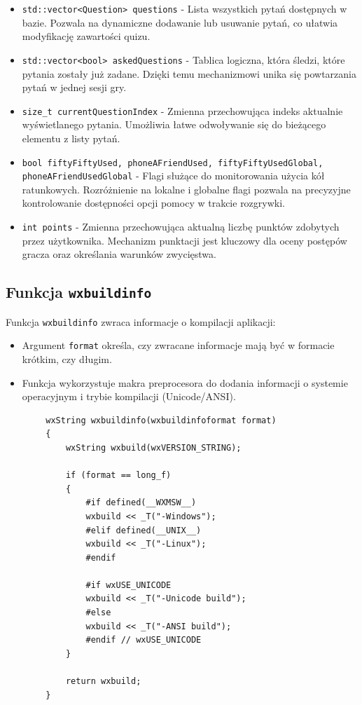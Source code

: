 \documentclass[]{article}
\begin{document}
\begin{itemize}
	\item \texttt{std::vector<Question> questions} - Lista wszystkich pytań dostępnych w bazie. Pozwala na dynamiczne dodawanie lub usuwanie pytań, co ułatwia modyfikację zawartości quizu.
	\item \texttt{std::vector<bool> askedQuestions} - Tablica logiczna, która śledzi, które pytania zostały już zadane. Dzięki temu mechanizmowi unika się powtarzania pytań w jednej sesji gry.
	\item \texttt{size\_t currentQuestionIndex} - Zmienna przechowująca indeks aktualnie wyświetlanego pytania. Umożliwia łatwe odwoływanie się do bieżącego elementu z listy pytań.
	\item \texttt{bool fiftyFiftyUsed, phoneAFriendUsed, fiftyFiftyUsedGlobal, phoneAFriendUsedGlobal} - Flagi służące do monitorowania użycia kół ratunkowych. Rozróżnienie na lokalne i globalne flagi pozwala na precyzyjne kontrolowanie dostępności opcji pomocy w trakcie rozgrywki.
	\item \texttt{int points} - Zmienna przechowująca aktualną liczbę punktów zdobytych przez użytkownika. Mechanizm punktacji jest kluczowy dla oceny postępów gracza oraz określania warunków zwycięstwa.
\end{itemize}
	
	\subsection{Funkcja \texttt{wxbuildinfo}}
	
	Funkcja \texttt{wxbuildinfo} zwraca informacje o kompilacji aplikacji:
	
	\begin{itemize}
		\item Argument \texttt{format} określa, czy zwracane informacje mają być w formacie krótkim, czy długim.
		\item Funkcja wykorzystuje makra preprocesora do dodania informacji o systemie operacyjnym i trybie kompilacji (Unicode/ANSI).
	\end{itemize}
	
	\begin{verbatim}
		wxString wxbuildinfo(wxbuildinfoformat format)
		{
			wxString wxbuild(wxVERSION_STRING);
			
			if (format == long_f)
			{
				#if defined(__WXMSW__)
				wxbuild << _T("-Windows");
				#elif defined(__UNIX__)
				wxbuild << _T("-Linux");
				#endif
				
				#if wxUSE_UNICODE
				wxbuild << _T("-Unicode build");
				#else
				wxbuild << _T("-ANSI build");
				#endif // wxUSE_UNICODE
			}
			
			return wxbuild;
		}
	\end{verbatim}
	
\end{document}
